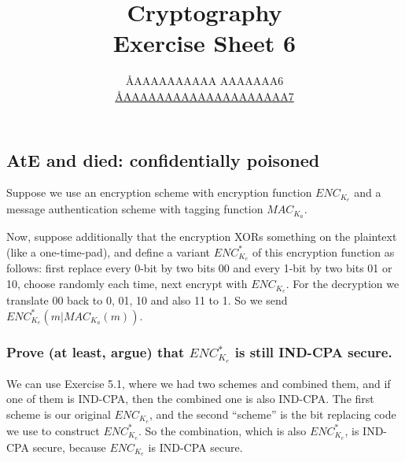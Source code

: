 \documentclass{article}
\title{Cryptography \\ Exercise Sheet 6}
\author{
  \AA{AAAAAAAAAA AAAAAAA}{6} \\
  \href{mailto:\AA{AAAAAAAAAAAAAAAAAAAA}{7}}{\AA{AAAAAAAAAAAAAAAAAAAA}{7}}
}
\begin{document}
  \maketitle

  \setcounter{section}{6}
  \subsection{AtE and died: confidentially poisoned}
  \begin{centerframebox}
    Suppose we use an encryption scheme with encryption function $ENC_{K_e}$
    and a message authentication scheme with tagging function $MAC_{K_a}$.

    Now, suppose additionally that the encryption XORs something on the plaintext (like a one-time-pad),
    and define a variant $ENC^*_{K_e}$ of this encryption function as follows:
    first replace every 0-bit by two bits 00 and every 1-bit by two bits 01 or 10,
    choose randomly each time, next encrypt with $ENC_{K_e}$.
    For the decryption we translate 00 back to 0, 01, 10 and also 11 to 1. So we send $ENC^*_{K_e} (m| MAC_{K_a} (m))$.
  \end{centerframebox}
  \subsubsection{Prove (at least, argue) that $ENC^*_{K_e}$ is still IND-CPA secure.}
  We can use Exercise 5.1, where we had two schemes and combined them,
  and if one of them is IND-CPA, then the combined one is also IND-CPA.
  The first scheme is our original $ENC_{K_e}$, and the second ``scheme'' is the bit replacing code we use to construct $ENC^*_{K_e}$.
  So the combination, which is also $ENC^*_{K_e}$, is IND-CPA secure, because $ENC_{K_e}$ is IND-CPA secure.
\end{document}
